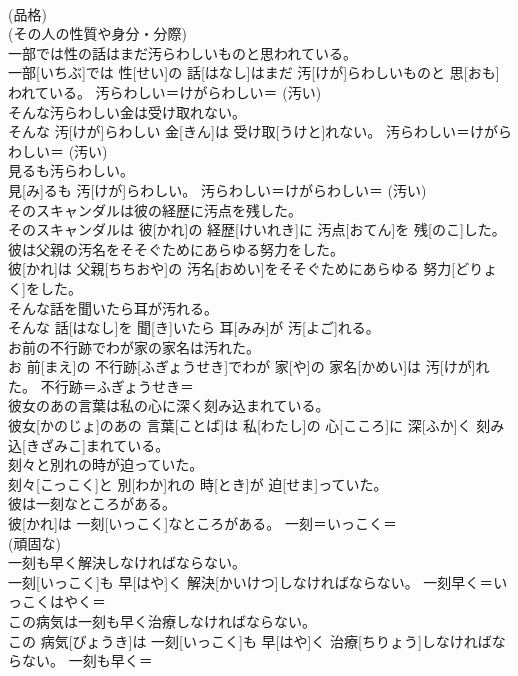\documentclass[8pt]{extreport}
\begin{document}
\begin{CJK}{UTF8}{min}
\\	(品格) 
\\	(その人の性質や身分・分際)
\\	一部では性の話はまだ汚らわしいものと思われている。	
\\	一部[いちぶ]では 性[せい]の 話[はなし]はまだ 汚[けが]らわしいものと 思[おも]われている。	汚らわしい＝けがらわしい＝ (汚い) 
\\	そんな汚らわしい金は受け取れない。	
\\	そんな 汚[けが]らわしい 金[きん]は 受け取[うけと]れない。	汚らわしい＝けがらわしい＝ (汚い) 
\\	見るも汚らわしい。	
\\	見[み]るも 汚[けが]らわしい。	汚らわしい＝けがらわしい＝ (汚い) 
\\	そのスキャンダルは彼の経歴に汚点を残した。	
\\	そのスキャンダルは 彼[かれ]の 経歴[けいれき]に 汚点[おてん]を 残[のこ]した。	
\\	彼は父親の汚名をそそぐためにあらゆる努力をした。	
\\	彼[かれ]は 父親[ちちおや]の 汚名[おめい]をそそぐためにあらゆる 努力[どりょく]をした。	
\\	そんな話を聞いたら耳が汚れる。	
\\	そんな 話[はなし]を 聞[き]いたら 耳[みみ]が 汚[よご]れる。	
\\	お前の不行跡でわが家の家名は汚れた。	
\\	お 前[まえ]の 不行跡[ふぎょうせき]でわが 家[や]の 家名[かめい]は 汚[けが]れた。	不行跡＝ふぎょうせき＝ 
\\	彼女のあの言葉は私の心に深く刻み込まれている。	
\\	彼女[かのじょ]のあの 言葉[ことば]は 私[わたし]の 心[こころ]に 深[ふか]く 刻み込[きざみこ]まれている。	
\\	刻々と別れの時が迫っていた。	
\\	刻々[こっこく]と 別[わか]れの 時[とき]が 迫[せま]っていた。	
\\	彼は一刻なところがある。	
\\	彼[かれ]は 一刻[いっこく]なところがある。	一刻＝いっこく＝ 
\\	(頑固な) 
\\	一刻も早く解決しなければならない。	
\\	一刻[いっこく]も 早[はや]く 解決[かいけつ]しなければならない。	一刻早く＝いっこくはやく＝ 
\\	この病気は一刻も早く治療しなければならない。	
\\	この 病気[びょうき]は 一刻[いっこく]も 早[はや]く 治療[ちりょう]しなければならない。	一刻も早く＝ 

\end{CJK}
\end{document}
